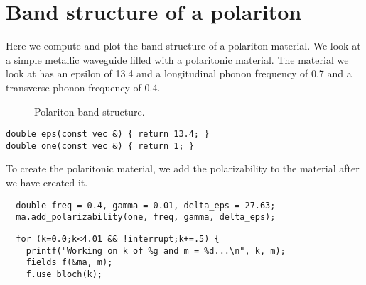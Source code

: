 \section{Band structure of a polariton}

\begin{comment}
#include <stdio.h>
#include <stdlib.h>

#include "dactyl.h"

const double rmax = 1.0;
\end{comment}

Here we compute and plot the band structure of a polariton material.  We
look at a simple metallic waveguide filled with a polaritonic material.
The material we look at has an epsilon of 13.4 and a longitudinal phonon
frequency of 0.7 and a transverse phonon frequency of 0.4.

\begin{figure}
\label{polaritonbands}
\caption{Polariton band structure.}
\end{figure}

\begin{verbatim}
double eps(const vec &) { return 13.4; }
double one(const vec &) { return 1; }
\end{verbatim}

\begin{comment}
int main(int argc, char **argv) {
  deal_with_ctrl_c();
  const int a = 10;
  const int m = 0;
  double k;
  const double ttot = 1000;  
\end{comment}

\begin{comment}
  mat ma(volcyl(rmax, 0.0, a), eps);
  const char *dirname = make_output_directory(argv[0]);
  printf("Storing output in directory %
  //FILE *ban = create_output_file(dirname, "bands");
  ma.set_output_directory(dirname);
  grace g("bands", dirname);
  g.set_range(0.0, 4.0, 0.0, 1.1);
\end{comment}

To create the polaritonic material, we add the polarizability to the
material after we have created it.

\begin{verbatim}
  double freq = 0.4, gamma = 0.01, delta_eps = 27.63;
  ma.add_polarizability(one, freq, gamma, delta_eps);
\end{verbatim}

\begin{verbatim}
  for (k=0.0;k<4.01 && !interrupt;k+=.5) {
    printf("Working on k of %g and m = %d...\n", k, m);
    fields f(&ma, m);
    f.use_bloch(k);
\end{verbatim}

